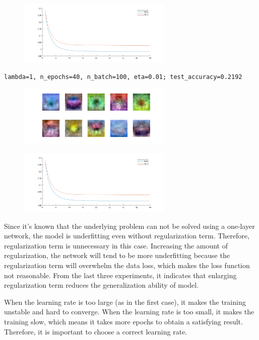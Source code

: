 \begin{figure}[h!]
	\centering
	\includegraphics[width=0.65\textwidth]{../Result_Pics/a3.png}
\end{figure}

\newpage
\begin{verbatim}
lambda=1, n_epochs=40, n_batch=100, eta=0.01; test_accuracy=0.2192
\end{verbatim}

\begin{figure}[h!]
	\centering
	\includegraphics[width=0.65\textwidth]{../Result_Pics/w3.png}
\end{figure}

\begin{figure}[h!]
	\centering
	\includegraphics[width=0.65\textwidth]{../Result_Pics/a3.png}
\end{figure}

Since it's known that the underlying problem can not be solved using a one-layer network, the model is underfitting even without regularization term. Therefore, regularization term is unnecessary in this case. Increasing the amount of regularization, the network will tend to be more underfitting because the regularization term will overwhelm the data loss, which makes the loss function not reasonable. From the last three experiments, it indicates that enlarging regularization term reduces the generalization ability of model.

When the learning rate is too large (as in the first case), it makes the training unstable and hard to converge. When the learning rate is too small, it makes the training slow, which means it takes more epochs to obtain a satisfying result. Therefore, it is important to choose a correct learning rate.




